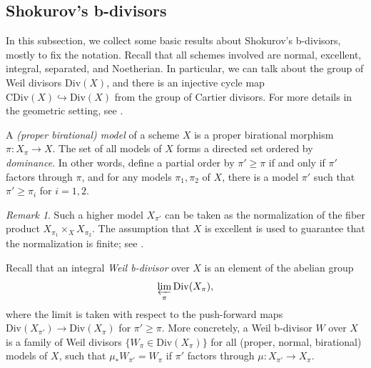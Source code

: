 \documentclass[11pt, leqno]{amsart}%
\theoremstyle{plain}
\theoremstyle{definition}
\theoremstyle{remark}
\newtheorem{remark}[theorem]{Remark}
\newcommand{\fX}{\mathfrak{X}}
\newcommand{\Div}{\mathrm{Div}}
\newcommand{\CDiv}{\mathrm{CDiv}}
\begin{document}
\subsection{Shokurov's b-divisors}

In this subsection, we collect some basic results about Shokurov's b-divisors, mostly to fix the notation. Recall that all schemes involved are normal, excellent, integral, separated, and Noetherian. 
In particular, we can talk about the group of Weil divisors $\Div(X)$, and there is an injective cycle map $\CDiv(X)\hookrightarrow \Div(X)$ from the group of Cartier divisors.  
For more details in the geometric setting, see \cites{Isk-b-div,Cor-flip,BdFF-vol-iso}. 

A \emph{(proper birational) model} of a scheme $X$ is a proper birational morphism $\pi:X_\pi\to X$. The set of all models of $X$ forms a directed set ordered by \emph{dominance}. In other words, define a partial order by $\pi'\ge \pi$ if and only if $\pi'$ factors through $\pi$, and for any models $\pi_1,\pi_2$ of $X$, there is a model $\pi'$ such that $\pi'\ge \pi_i$ for $i=1,2$. 

\begin{remark}\label{rmk:excellence}
    Such a higher model $X_{\pi'}$ can be taken as the normalization of the fiber product $X_{\pi_1}\times_X X_{\pi_2}$. The assumption that $X$ is excellent is used to guarantee that the normalization is finite; see \cite[\href{https://stacks.math.columbia.edu/tag/07QV}{Lemma 07QV}]{stacks-project}.
\end{remark}

Recall that an integral \emph{Weil b-divisor} over $X$ is an element of the abelian group
$$\varprojlim_\pi \Div(X_\pi),$$
where the limit is taken with respect to the push-forward maps $\Div(X_{\pi'})\to\Div(X_\pi)$ for $\pi'\ge \pi$. 
More concretely, a Weil b-divisor $W$ over $X$ is a family of Weil divisors $\{W_\pi\in\Div(X_\pi)\}$ for all (proper, normal, birational) models of $X$, such that $\mu_*W_{\pi'}=W_\pi$ if $\pi'$ factors through $\mu:X_{\pi'}\to X_\pi$. 
\end{document}

